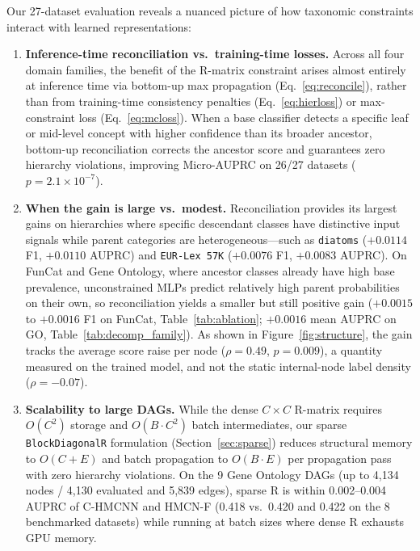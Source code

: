 \documentclass[preprint,12pt]{elsarticle}
\begin{document}
Our 27-dataset evaluation reveals a nuanced picture of how taxonomic
constraints interact with learned representations:
\begin{enumerate}[leftmargin=*,nosep]
  \item \textbf{Inference-time reconciliation vs.\ training-time losses.}
    Across all four domain families, the benefit of the R-matrix constraint
    arises almost entirely at inference time via bottom-up max propagation
    (Eq.~\eqref{eq:reconcile}), rather than from training-time consistency
    penalties (Eq.~\eqref{eq:hierloss}) or max-constraint loss
    (Eq.~\eqref{eq:mcloss}). When a base classifier detects a specific leaf or
    mid-level concept with higher confidence than its broader ancestor,
    bottom-up reconciliation corrects the ancestor score and guarantees zero
    hierarchy violations, improving Micro-AUPRC on 26/27 datasets ($p = 2.1
    \times 10^{-7}$).
  \item \textbf{When the gain is large vs.\ modest.} Reconciliation provides
    its largest gains on hierarchies where specific descendant classes have
    distinctive input signals while parent categories are heterogeneous---such
    as \texttt{diatoms} ($+0.0114$ F1, $+0.0110$ AUPRC) and \texttt{EUR-Lex
    57K} ($+0.0076$ F1, $+0.0083$ AUPRC). On FunCat and Gene Ontology, where
    ancestor classes already have high base prevalence, unconstrained MLPs
    predict relatively high parent probabilities on their own, so
    reconciliation yields a smaller but still positive gain ($+0.0015$ to
    $+0.0016$ F1 on FunCat, Table~\ref{tab:ablation}; $+0.0016$ mean AUPRC on
    GO, Table~\ref{tab:decomp_family}). As shown in Figure~\ref{fig:structure},
    the gain tracks the average score raise per node ($\rho = 0.49$,
    $p = 0.009$), a quantity measured on the trained model, and not the static
    internal-node label density ($\rho = -0.07$).
  \item \textbf{Scalability to large DAGs.} While the dense $C \times C$
    R-matrix requires $O(C^2)$ storage and $O(B \cdot C^2)$ batch intermediates,
    our sparse \texttt{BlockDiagonalR} formulation (Section~\ref{sec:sparse})
    reduces structural memory to $O(C{+}E)$ and batch propagation to $O(B \cdot
    E)$ per propagation pass with zero hierarchy violations. On the 9 Gene
    Ontology DAGs (up to 4,134 nodes / 4,130 evaluated and 5,839 edges),
    sparse R is within 0.002--0.004 AUPRC of C-HMCNN and HMCN-F (0.418
    vs.\ 0.420 and 0.422 on the 8 benchmarked datasets) while running at
    batch sizes where dense R exhausts GPU memory.

\end{enumerate}
\end{document}
